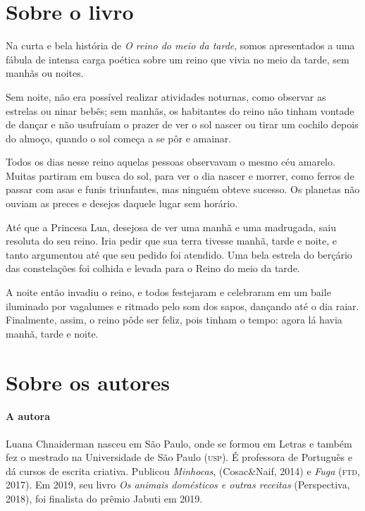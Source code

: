 \documentclass[11pt]{extarticle}
\begin{document}
\section{Sobre o livro}
Na curta e bela história de \textit{O reino do meio da tarde}, somos apresentados a uma fábula de intensa carga poética sobre um reino que vivia no meio da tarde, sem manhãs ou noites.

Sem noite, não era possível realizar atividades noturnas, como observar as estrelas ou ninar bebês; sem manhãs, os habitantes do reino não tinham vontade de dançar e não usufruíam o prazer de ver o sol nascer ou tirar um cochilo depois do almoço, quando o sol começa a se pôr e amainar.

Todos os dias nesse reino aquelas pessoas observavam o mesmo céu amarelo. Muitas partiram em busca do sol, para ver o dia nascer e morrer, como ferros de passar com asas e funis triunfantes, mas ninguém obteve sucesso. Os planetas não ouviam as preces e desejos daquele lugar sem horário.

Até que a Princesa Lua, desejosa de ver uma manhã e uma madrugada, saiu resoluta do seu reino. Iria pedir que sua terra tivesse manhã, tarde e noite, e tanto argumentou até que seu pedido foi atendido. Uma bela estrela do berçário das constelações foi colhida e levada para o Reino do meio da tarde.

A noite então invadiu o reino, e todos festejaram e celebraram em um baile iluminado por vagalumes e ritmado pelo som dos sapos, dançando até o dia raiar. Finalmente, assim, o reino pôde ser feliz, pois tinham o tempo: agora lá havia manhã, tarde e noite.

\reversemarginpar
\marginparwidth=5cm



\section{Sobre os autores}

\paragraph{A autora} Luana Chnaiderman nasceu em São Paulo, onde se formou em Letras e também fez o mestrado na Universidade de São Paulo (\textsc{usp}). É professora de Português e dá cursos de escrita criativa. Publicou \textit{Minhocas}, (Cosac\&Naif, 2014) e \textit{Fuga} (\textsc{ftd}, 2017). Em 2019, seu livro \textit{Os animais domésticos e outras receitas} (Perspectiva, 2018), foi finalista do prêmio Jabuti em 2019.
\end{document}
